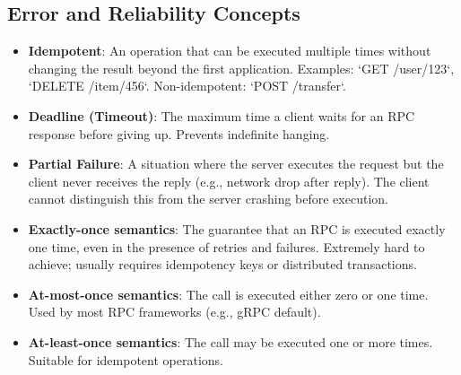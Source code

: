 \documentclass[10pt,a4paper]{article}
\begin{document}
\subsection*{Error and Reliability Concepts}
\begin{itemize}
    \item \textbf{Idempotent}: An operation that can be executed multiple times without changing the result beyond the first application. Examples: `GET /user/123`, `DELETE /item/456`. Non-idempotent: `POST /transfer`.
    \item \textbf{Deadline (Timeout)}: The maximum time a client waits for an RPC response before giving up. Prevents indefinite hanging.
    \item \textbf{Partial Failure}: A situation where the server executes the request but the client never receives the reply (e.g., network drop after reply). The client cannot distinguish this from the server crashing before execution.
    \item \textbf{Exactly-once semantics}: The guarantee that an RPC is executed exactly one time, even in the presence of retries and failures. Extremely hard to achieve; usually requires idempotency keys or distributed transactions.
    \item \textbf{At-most-once semantics}: The call is executed either zero or one time. Used by most RPC frameworks (e.g., gRPC default).
    \item \textbf{At-least-once semantics}: The call may be executed one or more times. Suitable for idempotent operations.
\end{itemize}
\end{document}

